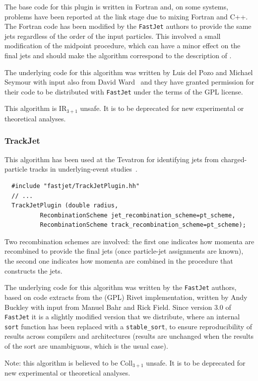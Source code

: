 \documentclass[12pt,a4]{article}
\newcommand{\fastjet}{\texttt{FastJet}\xspace}
\newcommand{\ttt}[1]{{\small\texttt{#1}}}
\begin{document}
The base code for this plugin is written in Fortran and, on some
systems, problems have been reported at the link stage due to mixing
Fortran and C++.
%
The Fortran code has been modified by the \fastjet authors to provide
the same jets regardless of the order of the input particles.
%
This involved a small modification of the midpoint procedure, which
can have a minor effect on the final jets and should make the algorithm
correspond to the description of \cite{Seymour:2006vv}.

The underlying code for this algorithm was written by Luis del Pozo
and Michael Seymour with input also from David Ward~\cite{PxCone}
%
and they have granted permission for their code to be distributed with
\fastjet under the terms of the GPL license.

This algorithm is IR$_{3+1}$ unsafe. It is to be deprecated for
new experimental or theoretical analyses.


\subsubsection{TrackJet}
%
This algorithm has been used at the Tevatron for identifying jets from
charged-particle tracks in underlying-event studies~\cite{Affolder:2001xt}.
%
\begin{lstlisting}
  #include "fastjet/TrackJetPlugin.hh"
  // ...
  TrackJetPlugin (double radius, 
		  RecombinationScheme jet_recombination_scheme=pt_scheme, 
		  RecombinationScheme track_recombination_scheme=pt_scheme);
\end{lstlisting}
Two recombination schemes are involved: the first one indicates how
momenta are recombined to provide the final jets (once particle-jet
assignments are known), the second one indicates how momenta are
combined in the procedure that constructs the jets.

The underlying code for this algorithm was written by the \fastjet
authors, based on code extracts from the (GPL) Rivet implementation, written
by Andy Buckley with input from Manuel Bahr and Rick Field.
%
Since version 3.0 of \fastjet it is a slightly modified version that
we distribute, where an internal \ttt{sort} function has been replaced
with a \ttt{stable\_sort}, to ensure reproducibility of results across
compilers and architectures (results are unchanged when the results of
the sort are unambiguous, which is the usual case).

Note: this algorithm is believed to be Coll$_{3+1}$ unsafe. It is to
be deprecated for new experimental or theoretical analyses.
\end{document}
